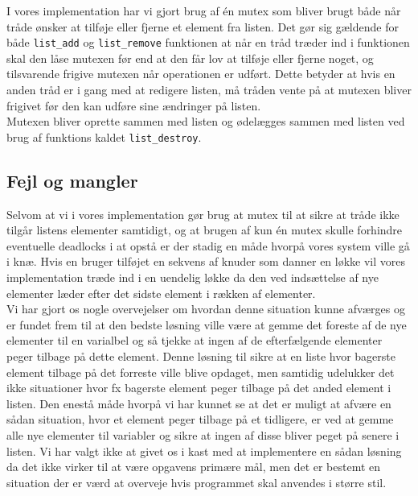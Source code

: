 \documentclass[main.tex]{subfile}
\begin{document}
I vores implementation har vi gjort brug af én mutex som bliver brugt både når tråde ønsker at tilføje eller fjerne et element fra listen. Det gør sig gældende for både \texttt{list\_add} og \texttt{list\_remove} funktionen at når en tråd træder ind i funktionen skal den låse mutexen før end at den får lov at tilføje eller fjerne noget, og tilsvarende frigive mutexen når operationen er udført. Dette betyder at hvis en anden tråd er i gang med at redigere listen, må tråden vente på at mutexen bliver frigivet før den kan udføre sine ændringer på listen.\\

Mutexen bliver oprette sammen med listen og ødelægges sammen med listen ved brug af funktions kaldet \texttt{list\_destroy}.

\subsection{Fejl og mangler}
Selvom at vi i vores implementation gør brug at mutex til at sikre at tråde ikke tilgår listens elementer samtidigt, og at brugen af kun én mutex skulle forhindre eventuelle deadlocks i at opstå er der stadig en måde hvorpå vores system ville gå i knæ. Hvis en bruger tilføjet en sekvens af knuder som danner en løkke vil vores implementation træde ind i en uendelig løkke da den ved indsættelse af nye elementer læder efter det sidste element i rækken af elementer.\\

Vi har gjort os nogle overvejelser om hvordan denne situation kunne afværges og er fundet frem til at den bedste løsning ville være at gemme det foreste af de nye elementer til en varialbel og så tjekke at ingen af de efterfælgende elementer peger tilbage på dette element. Denne løsning til sikre at en liste hvor bagerste element tilbage på det forreste ville blive opdaget, men samtidig udelukker det ikke situationer hvor fx bagerste element peger tilbage på det anded element i listen. Den enestå måde hvorpå vi har kunnet se at det er muligt at afvære en sådan situation, hvor et element peger tilbage på et tidligere, er ved at gemme alle nye elementer til variabler og sikre at ingen af disse bliver peget på senere i listen. Vi har valgt ikke at givet os i kast med at implementere en sådan løsning da det ikke virker til at være opgavens primære mål, men det er bestemt en situation der er værd at overveje hvis programmet skal anvendes i større stil.\\
\end{document}
